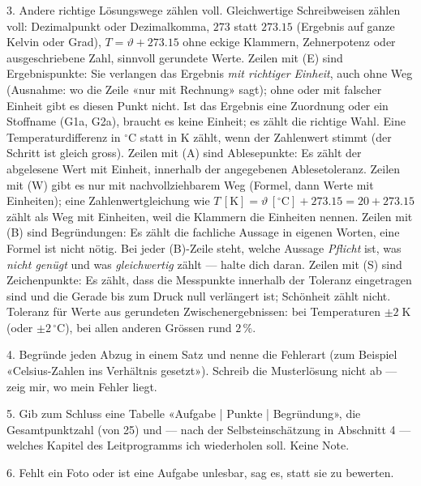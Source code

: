 \documentclass[11pt]{article}
\begin{document}
\begin{tcolorbox}[breakable,colback=lplinie!25,colframe=lplinie,boxrule=0.5pt,arc=1mm,fontupper=\small]
3. Andere richtige Lösungswege zählen voll. Gleichwertige Schreibweisen zählen voll: Dezimalpunkt oder Dezimalkomma, $273$ statt $273.15$ (Ergebnis auf ganze Kelvin oder Grad), $T = \vartheta + 273.15$ ohne eckige Klammern, Zehnerpotenz oder ausgeschriebene Zahl, sinnvoll gerundete Werte. Zeilen mit (E) sind Ergebnispunkte: Sie verlangen das Ergebnis \emph{mit richtiger Einheit}, auch ohne Weg (Ausnahme: wo die Zeile «nur mit Rechnung» sagt); ohne oder mit falscher Einheit gibt es diesen Punkt nicht. Ist das Ergebnis eine Zuordnung oder ein Stoffname (G1a, G2a), braucht es keine Einheit; es zählt die richtige Wahl. Eine Temperaturdifferenz in $^\circ\text{C}$ statt in $\text{K}$ zählt, wenn der Zahlenwert stimmt (der Schritt ist gleich gross). Zeilen mit (A) sind Ablesepunkte: Es zählt der abgelesene Wert mit Einheit, innerhalb der angegebenen Ablesetoleranz. Zeilen mit (W) gibt es nur mit nachvollziehbarem Weg (Formel, dann Werte mit Einheiten); eine Zahlenwertgleichung wie $T\,[\text{K}] = \vartheta\,[^\circ\text{C}] + 273.15 = 20 + 273.15$ zählt als Weg mit Einheiten, weil die Klammern die Einheiten nennen. Zeilen mit (B) sind Begründungen: Es zählt die fachliche Aussage in eigenen Worten, eine Formel ist nicht nötig. Bei jeder (B)-Zeile steht, welche Aussage \emph{Pflicht} ist, was \emph{nicht genügt} und was \emph{gleichwertig} zählt — halte dich daran. Zeilen mit (S) sind Zeichenpunkte: Es zählt, dass die Messpunkte innerhalb der Toleranz eingetragen sind und die Gerade bis zum Druck null verlängert ist; Schönheit zählt nicht. Toleranz für Werte aus gerundeten Zwischenergebnissen: bei Temperaturen $\pm 2\;\text{K}$ (oder $\pm 2\,^\circ\text{C}$), bei allen anderen Grössen rund $2\,\%$.\par
4. Begründe jeden Abzug in einem Satz und nenne die Fehlerart (zum Beispiel «Celsius-Zahlen ins Verhältnis gesetzt»). Schreib die Musterlösung nicht ab — zeig mir, wo mein Fehler liegt.\par
5. Gib zum Schluss eine Tabelle «Aufgabe | Punkte | Begründung», die Gesamtpunktzahl (von 25) und — nach der Selbsteinschätzung in Abschnitt 4 — welches Kapitel des Leitprogramms ich wiederholen soll. Keine Note.\par
6. Fehlt ein Foto oder ist eine Aufgabe unlesbar, sag es, statt sie zu bewerten.
\end{tcolorbox}
\end{document}
